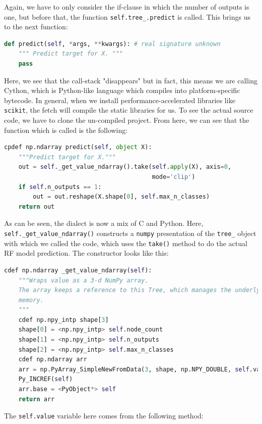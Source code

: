 \documentclass{IEEEtran}
\begin{document}
Again, we have to only consider the if-clause in which the number of outputs is one, but before that, the function \verb|self.tree_.predict| is called. This brings us to the next function:

\begin{lstlisting}[language=Python]
def predict(self, *args, **kwargs): # real signature unknown
    """ Predict target for X. """
    pass
\end{lstlisting}

Here, we see that the call-stack "disappears" but in fact, this means we are calling Cython, which is Python-like language which compiles into platform-specific bytecode. In general, when we install performance-accelerated libraries like \verb|scikit|, the fetch will compile the static libraries for us. To see the actual source code, we have to clone the un-compiled project. From here, we can see that the function which is called is the following:

\begin{lstlisting}[language=Python]
cpdef np.ndarray predict(self, object X):
    """Predict target for X."""
    out = self._get_value_ndarray().take(self.apply(X), axis=0,
                                         mode='clip')
    if self.n_outputs == 1:
        out = out.reshape(X.shape[0], self.max_n_classes)
    return out
\end{lstlisting}

As can be seen, the dialect is now a mix of C and Python. Here, \verb|self._get_value_ndarray()| constructs a \verb|numpy| presentation of the \verb|tree_| object with which we called the code, which uses the \verb|take()| method to do the actual \gls{RF} model prediction. The constructor looks like this:

\begin{lstlisting}[language=Python]
cdef np.ndarray _get_value_ndarray(self):
    """Wraps value as a 3-d NumPy array.
    The array keeps a reference to this Tree, which manages the underlying
    memory.
    """
    cdef np.npy_intp shape[3]
    shape[0] = <np.npy_intp> self.node_count
    shape[1] = <np.npy_intp> self.n_outputs
    shape[2] = <np.npy_intp> self.max_n_classes
    cdef np.ndarray arr
    arr = np.PyArray_SimpleNewFromData(3, shape, np.NPY_DOUBLE, self.value)
    Py_INCREF(self)
    arr.base = <PyObject*> self
    return arr
\end{lstlisting}

The \verb|self.value| variable here comes from the following method:
\end{document}
